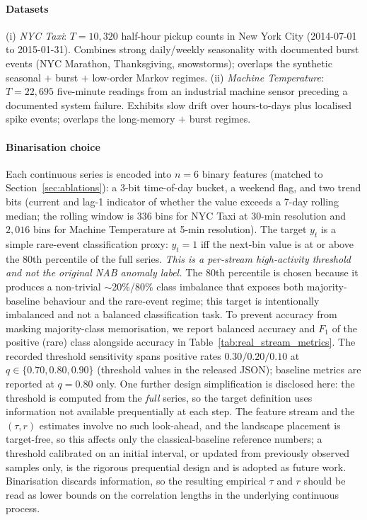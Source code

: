 \documentclass[sensors,article,submit,pdftex,moreauthors]{Definitions/mdpi}
\begin{document}
\paragraph{Datasets} (i) \emph{NYC Taxi}: $T = 10{,}320$ half-hour pickup counts in New York City (2014-07-01 to 2015-01-31). Combines strong daily/weekly seasonality with documented burst events (NYC Marathon, Thanksgiving, snowstorms); overlaps the synthetic seasonal $+$ burst $+$ low-order Markov regimes. (ii) \emph{Machine Temperature}: $T = 22{,}695$ five-minute readings from an industrial machine sensor preceding a documented system failure. Exhibits slow drift over hours-to-days plus localised spike events; overlaps the long-memory $+$ burst regimes.

\paragraph{Binarisation choice} Each continuous series is encoded into $n = 6$ binary features (matched to Section~\ref{sec:ablations}): a 3-bit time-of-day bucket, a weekend flag, and two trend bits (current and lag-1 indicator of whether the value exceeds a 7-day rolling median; the rolling window is $336$ bins for NYC Taxi at 30-min resolution and $2{,}016$ bins for Machine Temperature at 5-min resolution). The target $y_t$ is a simple rare-event classification proxy: $y_t = 1$ iff the next-bin value is at or above the 80th percentile of the full series. \emph{This is a per-stream high-activity threshold and not the original NAB anomaly label.} The 80th percentile is chosen because it produces a non-trivial $\sim$20\%/80\% class imbalance that exposes both majority-baseline behaviour and the rare-event regime; this target is intentionally imbalanced and not a balanced classification task. To prevent accuracy from masking majority-class memorisation, we report balanced accuracy and $F_1$ of the positive (rare) class alongside accuracy in Table~\ref{tab:real_stream_metrics}. The recorded threshold sensitivity spans positive rates $0.30 / 0.20 / 0.10$ at $q \in \{0.70, 0.80, 0.90\}$ (threshold values in the released JSON); baseline metrics are reported at $q = 0.80$ only. One further design simplification is disclosed here: the threshold is computed from the \emph{full} series, so the target definition uses information not available prequentially at each step. The feature stream and the $(\tau, r)$ estimates involve no such look-ahead, and the landscape placement is target-free, so this affects only the classical-baseline reference numbers; a threshold calibrated on an initial interval, or updated from previously observed samples only, is the rigorous prequential design and is adopted as future work. Binarisation discards information, so the resulting empirical $\tau$ and $r$ should be read as lower bounds on the correlation lengths in the underlying continuous process.
\end{document}
